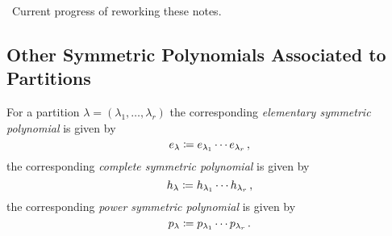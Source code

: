 




\noindent\hrulefill \, Current progress of reworking these notes. \hrulefill



\subsection{Other Symmetric Polynomials Associated to Partitions}




\begin{definition}
  For a partition $\lambda = (\lambda_1, \dotsc, \lambda_r)$ the corresponding \emph{elementary symmetric polynomial} is given by
  \[
              e_\lambda
    \coloneqq  e_{\lambda_1} \dotsm e_{\lambda_r} \,,
  \]
  the corresponding \emph{complete symmetric polynomial} is given by
  \[
              h_\lambda
    \coloneqq  h_{\lambda_1} \dotsm h_{\lambda_r} \,,
  \]
  the corresponding \emph{power symmetric polynomial} is given by
  \[
              p_\lambda
    \coloneqq  p_{\lambda_1} \dotsm p_{\lambda_r} \,.
  \]
\end{definition}













